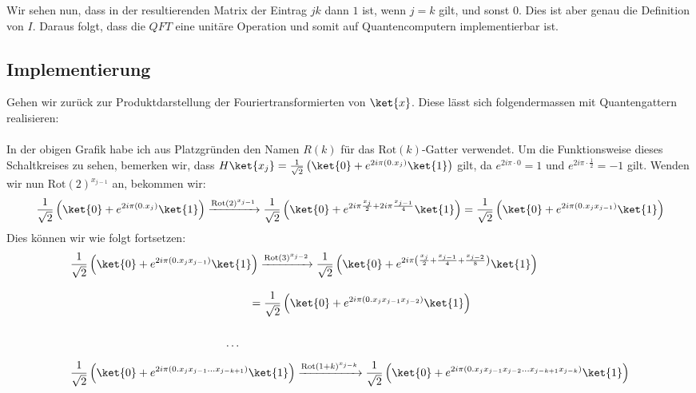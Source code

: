 Wir sehen nun, dass in der resultierenden Matrix der Eintrag $jk$ dann $1$ ist, wenn $j = k$ gilt, und sonst $0$. Dies ist aber genau die Definition von $I$. Daraus folgt, dass die $QFT$ eine unitäre Operation und somit auf Quantencomputern implementierbar ist.

\subsection{Implementierung}

Gehen wir zurück zur Produktdarstellung der Fouriertransformierten von $\ket{x}$. Diese lässt sich folgendermassen mit Quantengattern realisieren:
\paragraph{}
{
\scriptsize

}
\paragraph{}
In der obigen Grafik habe ich aus Platzgründen den Namen $R(k)$ für das $\text{Rot}(k)$-Gatter verwendet. Um die Funktionsweise dieses Schaltkreises zu sehen, bemerken wir, dass ${H\ket{x_j} = \frac{1}{\sqrt{2}}\left(\ket{0} + e^{2i\pi(0.x_j)}\ket{1}\right)}$ gilt, da $e^{2i\pi\cdot 0} = 1$ und $e^{2i\pi\cdot\frac{1}{2}} = -1$ gilt. Wenden wir nun $\text{Rot}(2)^{x_{j - 1}}$ an, bekommen wir:
$$\frac{1}{\sqrt{2}}\left(\ket{0} + e^{2i\pi(0.x_j)}\ket{1}\right) \xrightarrow{\text{Rot}(2)^{x_{j - 1}}} \frac{1}{\sqrt{2}}\left(\ket{0} + e^{2i\pi\frac{x_j}{2} + 2i\pi\frac{x_{j - 1}}{4}}\ket{1}\right) = \frac{1}{\sqrt{2}}\left(\ket{0} + e^{2i\pi(0.x_jx_{j - 1})}\ket{1}\right)$$
Dies können wir wie folgt fortsetzen: 
\begin{align*}
&\frac{1}{\sqrt{2}}\left(\ket{0} + e^{2i\pi(0.x_jx_{j - 1})}\ket{1}\right) \xrightarrow{\text{Rot}(3)^{x_{j - 2}}} \frac{1}{\sqrt{2}}\left(\ket{0} + e^{2i\pi\left(\frac{x_j}{2} + \frac{x_{j - 1}}{4} + \frac{x_{j - 2}}{8}\right)}\ket{1}\right) \\[0.3cm]
& \hspace{5.63cm}= \frac{1}{\sqrt{2}}\left(\ket{0} + e^{2i\pi(0.x_jx_{j - 1}x_{j - 2})}\ket{1}\right) \\[0.5cm]
&\hspace{.4\textwidth}\dots \\[0.2cm]
&\frac{1}{\sqrt{2}}\left(\ket{0} + e^{2i\pi(0.x_jx_{j - 1}\dots x_{j - k + 1})}\ket{1}\right) \xrightarrow{\text{Rot}(1 + k)^{x_{j - k}}} \frac{1}{\sqrt{2}}\left(\ket{0} + e^{2i\pi(0.x_jx_{j - 1}x_{j - 2}\dots x_{j - k + 1} x_{j - k})}\ket{1}\right)
\end{align*}

